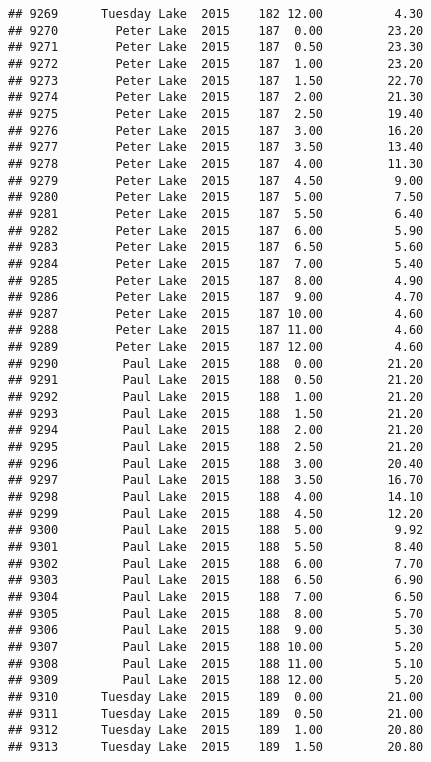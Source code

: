 \documentclass[
]{article}
\begin{document}
\begin{verbatim}
## 9269      Tuesday Lake  2015    182 12.00          4.30
## 9270        Peter Lake  2015    187  0.00         23.20
## 9271        Peter Lake  2015    187  0.50         23.30
## 9272        Peter Lake  2015    187  1.00         23.20
## 9273        Peter Lake  2015    187  1.50         22.70
## 9274        Peter Lake  2015    187  2.00         21.30
## 9275        Peter Lake  2015    187  2.50         19.40
## 9276        Peter Lake  2015    187  3.00         16.20
## 9277        Peter Lake  2015    187  3.50         13.40
## 9278        Peter Lake  2015    187  4.00         11.30
## 9279        Peter Lake  2015    187  4.50          9.00
## 9280        Peter Lake  2015    187  5.00          7.50
## 9281        Peter Lake  2015    187  5.50          6.40
## 9282        Peter Lake  2015    187  6.00          5.90
## 9283        Peter Lake  2015    187  6.50          5.60
## 9284        Peter Lake  2015    187  7.00          5.40
## 9285        Peter Lake  2015    187  8.00          4.90
## 9286        Peter Lake  2015    187  9.00          4.70
## 9287        Peter Lake  2015    187 10.00          4.60
## 9288        Peter Lake  2015    187 11.00          4.60
## 9289        Peter Lake  2015    187 12.00          4.60
## 9290         Paul Lake  2015    188  0.00         21.20
## 9291         Paul Lake  2015    188  0.50         21.20
## 9292         Paul Lake  2015    188  1.00         21.20
## 9293         Paul Lake  2015    188  1.50         21.20
## 9294         Paul Lake  2015    188  2.00         21.20
## 9295         Paul Lake  2015    188  2.50         21.20
## 9296         Paul Lake  2015    188  3.00         20.40
## 9297         Paul Lake  2015    188  3.50         16.70
## 9298         Paul Lake  2015    188  4.00         14.10
## 9299         Paul Lake  2015    188  4.50         12.20
## 9300         Paul Lake  2015    188  5.00          9.92
## 9301         Paul Lake  2015    188  5.50          8.40
## 9302         Paul Lake  2015    188  6.00          7.70
## 9303         Paul Lake  2015    188  6.50          6.90
## 9304         Paul Lake  2015    188  7.00          6.50
## 9305         Paul Lake  2015    188  8.00          5.70
## 9306         Paul Lake  2015    188  9.00          5.30
## 9307         Paul Lake  2015    188 10.00          5.20
## 9308         Paul Lake  2015    188 11.00          5.10
## 9309         Paul Lake  2015    188 12.00          5.20
## 9310      Tuesday Lake  2015    189  0.00         21.00
## 9311      Tuesday Lake  2015    189  0.50         21.00
## 9312      Tuesday Lake  2015    189  1.00         20.80
## 9313      Tuesday Lake  2015    189  1.50         20.80

\end{verbatim}
\end{document}
